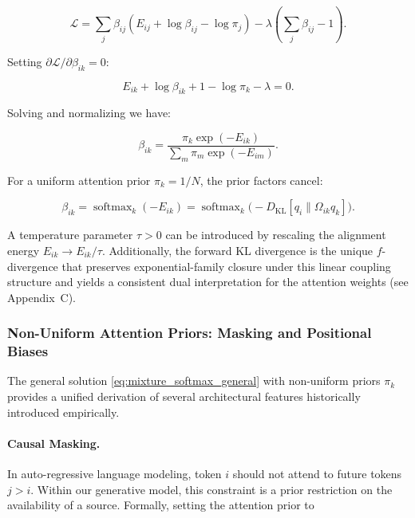 \documentclass[twoside,11pt]{article}
\begin{document}
\begin{equation}
\mathcal{L} = \sum_j \beta_{ij}(E_{ij} + \log \beta_{ij} - \log \pi_j) - \lambda\left(\sum_j \beta_{ij} - 1\right).
\end{equation}

Setting $\partial \mathcal{L} / \partial \beta_{ik} = 0$:

\begin{equation}
E_{ik} + \log \beta_{ik} + 1 - \log \pi_k - \lambda = 0.
\end{equation}

Solving and normalizing we have:

\begin{equation}
\beta_{ik} = \frac{\pi_k \exp(-E_{ik})}{\sum_m \pi_m \exp(-E_{im})}.
\label{eq:mixture_softmax_general}
\end{equation}

For a uniform attention prior $\pi_k = 1/N$, the prior factors cancel:

\begin{equation}
\boxed{\beta_{ik} = \operatorname{softmax}_k(-E_{ik}) = \operatorname{softmax}_k\!\big(-D_{\mathrm{KL}}[q_i \| \Omega_{ik} q_k]\big).}
\label{eq:mixture_softmax}
\end{equation}

A temperature parameter $\tau > 0$ can be introduced by rescaling the alignment energy $E_{ik} \to E_{ik}/\tau$. Additionally, the forward KL divergence is the unique $f$-divergence that preserves exponential-family closure under this linear coupling structure and yields a consistent dual interpretation for the attention weights (see Appendix~C).

\subsubsection{Non-Uniform Attention Priors: Masking and Positional Biases}
\label{sec:nonuniform_priors}

The general solution \eqref{eq:mixture_softmax_general} with non-uniform priors $\pi_k$ provides a unified derivation of several architectural features historically introduced empirically. 

\paragraph{Causal Masking.}
In auto-regressive language modeling, token $i$ should not attend to future tokens $j > i$. Within our generative model, this constraint is a prior restriction on the availability of a source. Formally, setting the attention prior to
\end{document}

